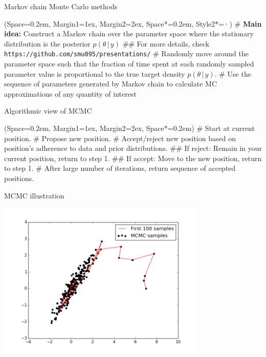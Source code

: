 \documentclass[12pt, aspectratio=149]{beamer}
\newcommand{\listSpace}{0.2em}
\theoremstyle{plain}
\begin{document}
\begin{frame}[fragile]{Markov chain Monte Carlo methods}
	\begin{easylist}
		\ListProperties(Space=\listSpace, Margin1=1ex, Margin2=2ex, Space*=\listSpace, Style2*=$\color{bggraydark}\blacktriangleright$\space)
		# \textbf{Main idea:} Construct a Markov chain over the parameter space where the stationary distribution is the posterior $p(\theta \,\vert\, y)$
		## For more details, check \footnotesize\texttt{https://github.com/smu095/presentations/}
		# Randomly move around the parameter space such that the fraction of time spent at each randomly sampled parameter value is proportional to the true target density $p(\theta \,\vert\,y)$.
		# Use the sequence of parameters generated by Markov chain to calculate MC approximations of any quantity of interest
	\end{easylist}
\end{frame}

\begin{frame}[fragile]{Algorithmic view of MCMC}
	\begin{easylist}[enumerate]
		\ListProperties(Space=\listSpace, Margin1=1ex, Margin2=2ex, Space*=\listSpace)
		# Start at current position.
		# Propose new position.
		# Accept/reject new position based on position's adherence to data and prior distributions.
		## If reject: Remain in your current position, return to step 1.
		## If accept: Move to the new position, return to step 1.
		# After large number of iterations, return sequence of accepted positions.
	\end{easylist}
\end{frame}

\begin{frame}{MCMC illustration}
\begin{center}
\includegraphics[width=0.75\textwidth]{figs/mcmc_illustration.png}
\end{center}
\end{frame}
\end{document}
